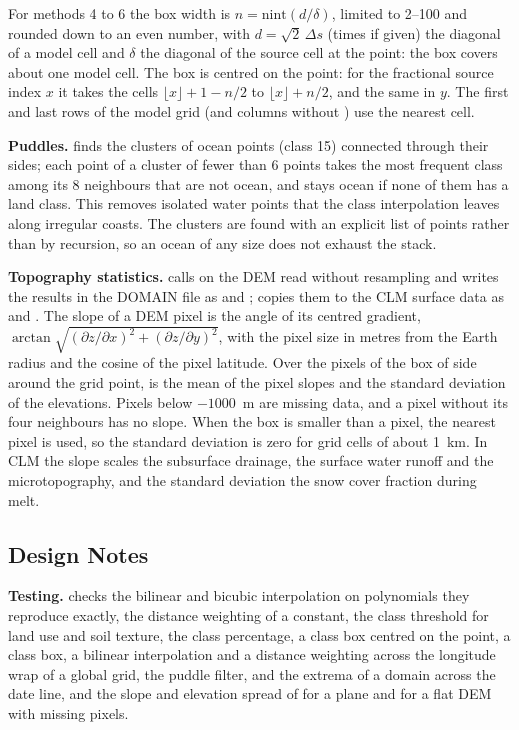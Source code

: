 \noindent For methods 4 to 6 the box width is $n = \mathrm{nint}(d/\delta)$,
limited to 2--100 and rounded down to an even number, with
$d = \sqrt2\,\Delta s$ (times  if given) the diagonal of a
model cell and $\delta$ the diagonal of the source cell at the point: the
box covers about one model cell. The box is centred on the point: for the
fractional source index $x$ it takes the cells
$\lfloor x\rfloor+1-n/2$ to $\lfloor x\rfloor+n/2$, and the same in $y$. The first and last rows of the model grid
(and columns without ) use the nearest cell.

\textbf{Puddles.}  finds the clusters of ocean points
(class 15) connected through their sides; each point of a cluster of fewer
than 6 points takes the most frequent class among its 8 neighbours that are
not ocean, and stays ocean if none of them has a land class. This removes
isolated water points that the class interpolation leaves along irregular
coasts. The clusters are found with an explicit list of points rather than
by recursion, so an ocean of any size does not exhaust the stack.

\textbf{Topography statistics.}  calls  on
the DEM read without resampling and writes the results in the DOMAIN file
as  and ;  copies them to
the CLM surface data as  and . The slope of a
DEM pixel is the angle of its centred gradient,
$\arctan\sqrt{(\partial z/\partial x)^2 + (\partial z/\partial y)^2}$,
with the pixel size in metres from the Earth radius and the cosine of the
pixel latitude. Over the pixels of the box of side  around the
grid point,  is the mean of the pixel slopes and
 the standard deviation of the elevations. Pixels below
$-1000$~m are missing data, and a pixel without its four neighbours has no
slope. When the box is smaller than a pixel, the nearest pixel is used, so
the standard deviation is zero for grid cells of about 1~km. In CLM the
slope scales the subsurface drainage, the surface water runoff and the
microtopography, and the standard deviation the snow cover fraction during
melt.

\subsection{Design Notes}

\textbf{Testing.}  checks the bilinear
and bicubic interpolation on polynomials they reproduce exactly, the
distance weighting of a constant, the class threshold for land use and soil
texture, the class percentage, a class box centred on the point, a class
box, a bilinear interpolation
and a distance weighting across the longitude wrap of a global grid, the puddle filter, and the
extrema of a domain across the date line, and the slope and elevation
spread of  for a plane and for a flat DEM with missing
pixels.


